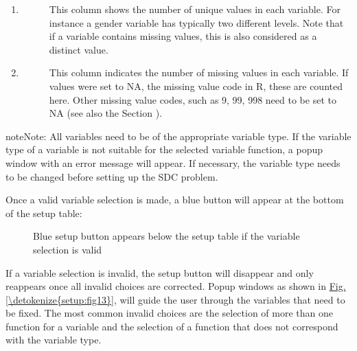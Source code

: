 \documentclass[letterpaper,10pt,english]{sphinxmanual}
\begin{document}
\begin{enumerate}
\begin{description}
\end{description}

\item {} \begin{description}
\item[{}] \leavevmode
This column shows the number of unique values in each variable. For instance a gender
variable has typically two different levels. Note that if a variable contains missing
values, this is also considered as a distinct value.

\end{description}

\item {} \begin{description}
\item[{}] \leavevmode
This column indicates the number of missing values in each variable.
If values were set to NA, the missing value code in R, these are counted here. Other
missing value codes, such as 9, 99, 998 need to be set to NA
(see also the Section ).

\end{description}

\end{enumerate}

\begin{sphinxadmonition}{note}{Note:}
All variables need to be of the appropriate variable type. If the variable type of a
variable is not suitable for the selected variable function, a popup window with an error
message will appear. If necessary, the variable type needs to be changed before setting up the SDC
problem.
\end{sphinxadmonition}

Once a valid variable selection is made, a blue button will appear at the bottom of the
setup table:

\begin{figure}[htbp]
\centering
\capstart

\noindent{}
\caption{Blue setup button appears below the setup table if the variable selection is valid}\label{\detokenize{setup:fig12}}\label{\detokenize{setup:id3}}\end{figure}

If a variable selection is invalid, the setup button will disappear and only reappears once
all invalid choices are corrected. Popup windows as shown in \hyperref[\detokenize{setup:fig13}]{Fig.\@ \ref{\detokenize{setup:fig13}}},
will guide the user through the variables
that need to be fixed. The most common invalid choices are the selection of more
than one function for a variable and the selection of a function that does not correspond
with the variable type.
\end{document}
